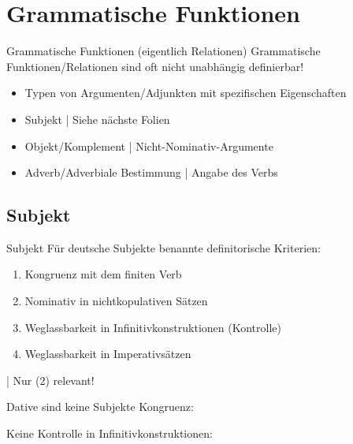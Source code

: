 \section{Grammatische Funktionen}

\begin{frame}
  {Grammatische Funktionen (eigentlich Relationen)}
  \onslide<+->
  \onslide<+->
  Grammatische Funktionen\slash Relationen sind oft nicht unabhängig definierbar!\\
  \Zeile
  \begin{itemize}[<+->]
    \item Typen von Argumenten\slash Adjunkten mit spezifischen Eigenschaften
      \Halbzeile
    \item \alert{Subjekt} | Siehe nächste Folien
    \item \alert{Objekt}\slash \alert{Komplement} | Nicht-Nominativ-Argumente
    \item \alert{Adverb}\slash \alert{Adverbiale Bestimmung} | Angabe des Verbs
  \end{itemize}
\end{frame}

\subsection{Subjekt}

\begin{frame}
  {Subjekt}
  \onslide<+->
  \onslide<+->
  Für \alert{deutsche Subjekte} benannte definitorische Kriterien:\\
  \Halbzeile
  \begin{enumerate}[<+->]
    \item \alert{Kongruenz} mit dem finiten Verb
    \item \alert{Nominativ} in nichtkopulativen Sätzen
    \item Weglassbarkeit in \alert{Infinitivkonstruktionen} (Kontrolle)
    \item Weglassbarkeit in \alert{Imperativsätzen}
  \end{enumerate}
  \Zeile
  \onslide<+->
  \citet{Reis82} | Nur (2) relevant!
\end{frame}


\begin{frame}
  {Dative sind keine Subjekte}
  \onslide<+->
  \onslide<+->
  Kongruenz:\\
  \onslide<+->
  \Viertelzeile
  \begin{exe}
  \end{exe}
  \onslide<+->
  \Halbzeile
  Keine Kontrolle in Infinitivkonstruktionen:\\
  \onslide<+->
  \Viertelzeile
  \begin{exe}
  \end{exe}
\end{frame}


